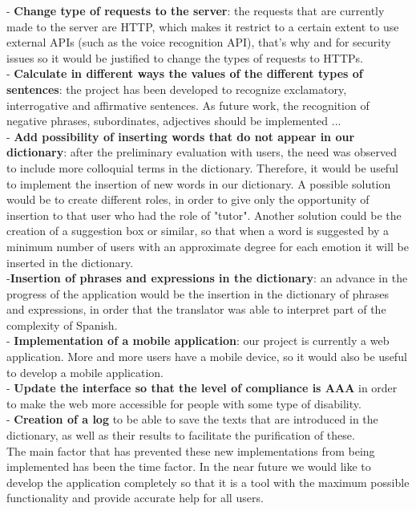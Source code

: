 - \textbf{Change type of requests to the server}: the requests that are currently made to the server are HTTP, which makes it restrict to a certain extent to use external APIs (such as the voice recognition API), that's why and for security issues so it would be justified to change the types of requests to HTTPs.\\



- \textbf{Calculate in different ways the values of the different types of sentences}: the project has been developed to recognize exclamatory, interrogative and affirmative sentences. As future work, the recognition of negative phrases, subordinates, adjectives should be implemented ...\\


- \textbf{Add possibility of inserting words that do not appear in our dictionary}: after the preliminary evaluation with users, the need was observed to include more colloquial terms in the dictionary. Therefore, it would be useful to implement the insertion of new words in our dictionary. A possible solution would be to create different roles, in order to give only the opportunity of insertion to that user who had the role of "tutor". Another solution could be the creation of a suggestion box or similar, so that when a word is suggested by a minimum number of users with an approximate degree for each emotion it will be inserted in the dictionary.\\


-\textbf{Insertion of phrases and expressions in the dictionary}: an advance in the progress of the application would be the insertion in the dictionary of phrases and expressions, in order that the translator was able to interpret part of the complexity of Spanish.\\



- \textbf{Implementation of a mobile application}: our project is currently a web application. More and more users have a mobile device, so it would also be useful to develop a mobile application.\\

- \textbf{Update the interface so that the level of compliance is AAA} in order to make the web more accessible for people with some type of disability.\\



- \textbf{Creation of a log} to be able to save the texts that are introduced in the dictionary, as well as their results to facilitate the purification of these.\\


The main factor that has prevented these new implementations from being implemented has been the time factor. In the near future we would like to develop the application completely so that it is a tool with the maximum possible functionality and provide accurate help for all users.\\


